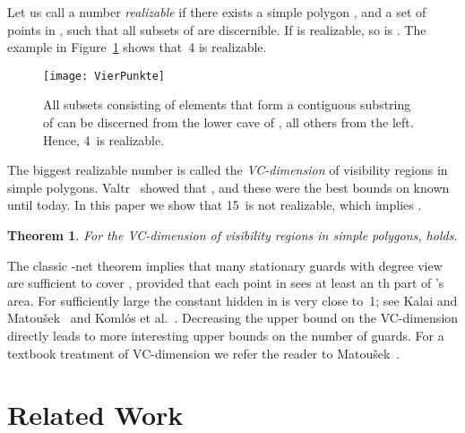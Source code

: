 \documentclass[11pt]{article}
\newtheorem{theorem}{Theorem}
\begin{document}
Let us call a number  {\em realizable} if there exists a simple polygon , and a set  of 
points in , such that all subsets of  are discernible. If  is realizable, so is .
The example in Figure~\ref{VierPunkte-fig} shows that~4 is realizable. 

\begin{figure}[hbtp]\begin{center}\texttt{[image: VierPunkte]}\caption{All subsets consisting of elements that form a contiguous substring of  can be discerned from the 
    lower cave of , all others from the left. Hence, 4~is realizable.}\label{VierPunkte-fig}
  \end{center}\end{figure}

The biggest realizable number  is called
the {\em VC-dimension} of visibility regions in simple polygons. 
Valtr~\cite{v-ggwps-98} showed that , and these were the best bounds on 
known until today. 
In this paper we show that 15~is not realizable, which implies .

\begin{theorem}   \label{statement-theo}
For the VC-dimension  of visibility  regions in simple polygons,  holds.
\end{theorem}

The classic -net theorem implies that  many stationary guards
with  degree view are sufficient to cover , provided that each point in  sees
at least an th part of 's area. For sufficiently large  the constant hidden in  is very close to~1; 
see Kalai and Matou\v sek~\cite{km-ggwep-97} and Koml{\'o}s et al.~\cite{kpw-atben-92}. Decreasing the upper bound on the VC-dimension  directly leads to more interesting 
upper bounds on the number of guards. 
For a textbook treatment of VC-dimension we refer the reader to Matou\v sek~\cite{m-ldg-02}.


\section{Related Work}         \label{related-sec}
\end{document}
